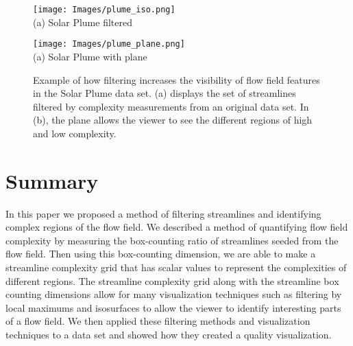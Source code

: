 \documentclass{egpubl}
\begin{document}
\begin{figure}[h]
        \centering
               	\begin{minipage}{0.47\linewidth}
                      	\centering \small
                        \texttt{[image: Images/plume\_iso.png]}\\(a) Solar Plume filtered
                \end{minipage}
                \begin{minipage}{0.47\linewidth}
                        \centering \small
                        \texttt{[image: Images/plume\_plane.png]}\\(a) Solar Plume with plane
                \end{minipage}
        \caption{Example of how filtering increases the visibility of flow field features in the Solar Plume data set. (a) displays the set of streamlines filtered by complexity measurements from an original data set. In (b), the plane allows the viewer to see the different regions of high and low complexity.}
        \label{fig:plume_lines}
\end{figure}

\section{Summary}

In this paper we proposed a method of filtering streamlines and identifying complex regions of the flow field.
We described a method of quantifying flow field complexity by measuring the box-counting ratio of streamlines seeded from the flow field.
Then using this box-counting dimension, we are able to make a streamline complexity grid that has scalar values to represent the complexities of different regions.
The streamline complexity grid along with the streamline box counting dimensions allow for many visualization techniques such as filtering by local maximums and isosurfaces to allow the viewer to identify interesting parts of a flow field.
We then applied these filtering methods and visualization techniques to a data set and showed how they created a quality visualization.


\clearpage
%


\end{document}
